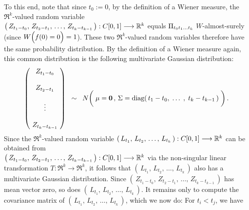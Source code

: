 \vskip 0.3cm
\noindent
To this end, note that since $t_{0} := 0$, by the definition of a Wiener measure,
the $\Re^{k}$-valued random variable\\
$\left(\,Z_{t_{1}-t_{0}},\,Z_{t_{2}-t_{1}},\,\ldots,\,Z_{t_{k}-t_{k-1}}\,\right) : C[0,1] \longrightarrow \mathbb{R}^{k}$\;
equals \;$\Pi_{t_{0}t_{1}\ldots t_{k}}$\; $W$-almost-surely (since $W\!\left(f(0)\overset{{\color{white}:}}{=}0\right)=1$).
These two $\Re^{k}$-valued random variables therefore have the same probability distribution.
By the definition of a Wiener measure again, this common distribution is the following
multivariate Gaussian distribution:
\begin{equation*}
	\left(\!
	\begin{array}{c}
	Z_{t_{1}-t_{0}} \\ \\ Z_{t_{2}-t_{1}} \\ \\ \vdots \\ \\ Z_{t_{k}-t_{k-1}}
	\end{array}
	\!\right)
	\;\; \sim \;\;
	N\!\left(\;
	\mathbf{\mu} = \mathbf{0}\,,\,
	\overset{{\color{white}1}}{\Sigma} = \diag\!\left(\,t_{1}-t_{0},\; \ldots\; ,\; t_{k}-t_{k-1}\,\right)
	\;\right).
\end{equation*}
Since the $\Re^{k}$-valued random variable
$\left(\,L_{t_{1}},\,L_{t_{2}},\,\ldots,\,L_{t_{k}}\,\right) : C[0,1] \longrightarrow \mathbb{R}^{k}$
can be obtained from\\
$\left(\,Z_{t_{1}-t_{0}},\,Z_{t_{2}-t_{1}},\,\ldots,\,Z_{t_{k}-t_{k-1}}\,\right): C[0,1] \longrightarrow \mathbb{R}^{k}$
via the non-singular linear transformation $T : \Re^{k} \longrightarrow \Re^{k}$,
it follows that $\left(\,L_{t_{1}},\,L_{t_{2}},\,\ldots,\,L_{t_{k}}\,\right)$ also has a
multivariate Gaussian distribution.
Since
$\left(\,Z_{t_{1}-t_{0}},\,Z_{t_{2}-t_{1}},\,\ldots,\,Z_{t_{k}-t_{k-1}}\,\right)$
has mean vector zero, so does 
$\left(\,L_{t_{1}},\,L_{t_{2}},\,\ldots,\,L_{t_{k}}\,\right)$.
It remains only to compute the covariance matrix of
$\left(\,L_{t_{1}},\,L_{t_{2}},\,\ldots,\,L_{t_{k}}\,\right)$,
which we now do: For $t_{i} < t_{j}$, we have
